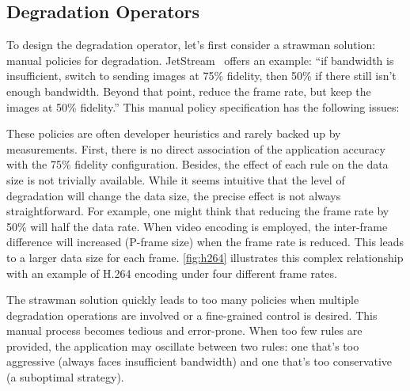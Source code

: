 \subsection{Degradation Operators}
\label{sec:prog-abs}

To design the degradation operator, let's first consider a strawman solution:
manual policies for degradation. JetStream~\cite{rabkin2014aggregation} offers
an example: ``if bandwidth is insufficient, switch to sending images at 75\%
fidelity, then 50\% if there still isn't enough bandwidth. Beyond that point,
reduce the frame rate, but keep the images at 50\% fidelity.'' This manual
policy specification has the following issues:

 These policies are often developer heuristics and
rarely backed up by measurements. First, there is no direct association of the
application accuracy with the 75\% fidelity configuration. Besides, the effect
of each rule on the data size is not trivially available.  While it seems
intuitive that the level of degradation will change the data size, the precise
effect is not always straightforward. For example, one might think that reducing
the frame rate by 50\% will half the data rate. When video encoding is employed,
the inter-frame difference will increased (P-frame size) when the frame rate is
reduced. This leads to a larger data size for each frame. \autoref{fig:h264}
illustrates this complex relationship with an example of H.264 encoding under
four different frame rates.

 The strawman solution quickly leads to too many policies
when multiple degradation operations are involved or a fine-grained control is
desired. This manual process becomes tedious and error-prone. When too few rules
are provided, the application may oscillate between two rules: one that's too
aggressive (always faces insufficient bandwidth) and one that's too conservative
(a suboptimal strategy).


